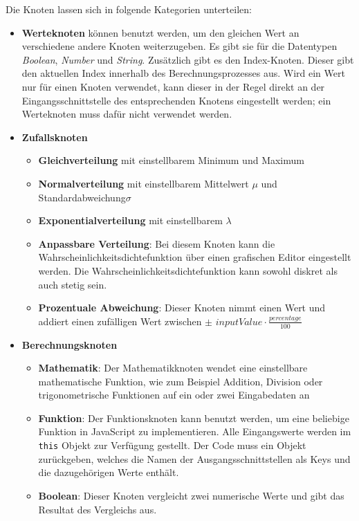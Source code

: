 Die Knoten lassen sich in folgende Kategorien unterteilen:
\begin{itemize}
    \item \textbf{Werteknoten} können benutzt werden, um den gleichen Wert an verschiedene andere Knoten weiterzugeben. Es gibt sie für die Datentypen \textit{Boolean}, \textit{Number} und \textit{String}. Zusätzlich gibt es den Index-Knoten. Dieser gibt den aktuellen Index innerhalb des Berechnungsprozesses aus. Wird ein Wert nur für einen Knoten verwendet, kann dieser in der Regel direkt an der Eingangsschnittstelle des entsprechenden Knotens eingestellt werden; ein Werteknoten muss dafür nicht verwendet werden.
    \item \textbf{Zufallsknoten}
    \begin{itemize}
        \item \textbf{Gleichverteilung} mit einstellbarem Minimum und Maximum
        \item \textbf{Normalverteilung} mit einstellbarem Mittelwert $\mu$ und Standardabweichung\nobreakspace $\sigma$
        \item \textbf{Exponentialverteilung} mit einstellbarem $\lambda$
        \item \textbf{Anpassbare Verteilung}: Bei diesem Knoten kann die Wahrscheinlichkeitsdichtefunktion über einen grafischen Editor eingestellt werden. Die Wahrscheinlichkeitsdichtefunktion kann sowohl diskret als auch stetig sein.
        \item \textbf{Prozentuale Abweichung}: Dieser Knoten nimmt einen Wert und addiert einen zufälligen Wert zwischen $\pm \, \, inputValue \cdot \frac{percentage}{100}$
    \end{itemize}
    \item \textbf{Berechnungsknoten}
    \begin{itemize}
        \item \textbf{Mathematik}: Der Mathematikknoten wendet eine einstellbare mathematische Funktion, wie zum Beispiel Addition, Division oder trigonometrische Funktionen auf ein oder zwei Eingabedaten an
        \item \textbf{Funktion}: Der Funktionsknoten kann benutzt werden, um eine beliebige Funktion in JavaScript zu implementieren. Alle Eingangswerte werden im \texttt{this} Objekt zur Verfügung gestellt. Der Code muss ein Objekt zurückgeben, welches die Namen der Ausgangsschnittstellen als Keys und die dazugehörigen Werte enthält.
        \item \textbf{Boolean}: Dieser Knoten vergleicht zwei numerische Werte und gibt das Resultat des Vergleichs aus.

\end{itemize}
\end{itemize}
